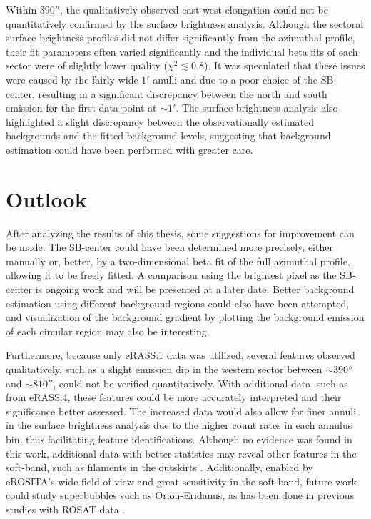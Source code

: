 Within \(390''\), the qualitatively observed east-west elongation could not be quantitatively confirmed by the surface brightness analysis. Although the sectoral surface brightness profiles did not differ significantly from the azimuthal profile, their fit parameters often varied significantly and the individual beta fits of each sector were of slightly lower quality (\(\chi^2 \lesssim 0.8\)). It was speculated that these issues were caused by the fairly wide \(1'\) anulli and due to a poor choice of the SB-center, resulting in a significant discrepancy between the north and south emission for the first data point at \(\sim 1'\). The surface brightness analysis also highlighted a slight discrepancy between the observationally estimated backgrounds and the fitted background levels, suggesting that background estimation could have been performed with greater care.   
\section{Outlook}
After analyzing the results of this thesis, some suggestions for improvement can be made. The SB-center could have been determined more precisely, either manually or, better, by a two-dimensional beta fit of the full azimuthal profile, allowing it to be freely fitted. A comparison using the brightest pixel as the SB-center is ongoing work and will be presented at a later date. Better background estimation using different background regions could also have been attempted, and visualization of the background gradient by plotting the background emission of each circular region may also be interesting. 

Furthermore, because only eRASS:1 data was utilized, several features observed qualitatively, such as a slight emission dip in the western sector between \(\sim 390''\) and \(\sim 810''\), could not be verified quantitatively. With additional data, such as from eRASS:4, these features could be more accurately interpreted and their significance better assessed. The increased data would also allow for finer annuli in the surface brightness analysis due to the higher count rates in each annulus bin, thus facilitating feature identifications. Although no evidence was found in this work, additional data with better statistics may reveal other features in the soft-band, such as filaments in the outskirts \citep{Cen_1999}. Additionally, enabled by eROSITA's wide field of view and great sensitivity in the soft-band, future work could study superbubbles such as Orion-Eridanus, as has been done in previous studies with ROSAT data \citep{Krause_2014}. 